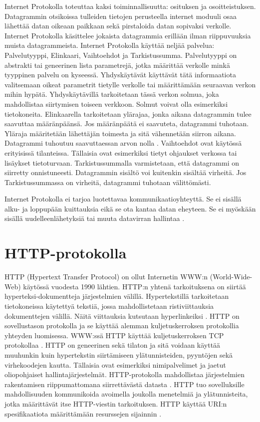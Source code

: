 \documentclass[utf8]{gradu3}
\begin{document}
Internet Protokolla toteuttaa kaksi toiminnallisuutta: osituksen ja osoitteistuksen. Datagrammin otsikoissa tulleiden tietojen perusteella internet moduuli osaa lähettää datan oikeaan paikkaan sekä pirstaloida datan sopivaksi verkolle. Internet Protokolla käsittelee jokaista datagrammia erillään ilman riippuvuuksia muista datagrammeista. Internet Protokolla käyttää neljää palvelua: Palvelutyyppi, Elinkaari, Vaihtoehdot ja Tarkistussumma. Palvelutyyppi on abstrakti tai geneerinen lista parametrejä, jotka määrittää verkolle minkä tyyppinen palvelu on kyseessä. Yhdyskäytävät käyttävät tätä informaatiota valitsemaan oikeat parametrit tietylle verkolle tai määrittämään seuraavan verkon mihin hypätä. Yhdyskäytävillä tarkoitetaan tässä verkon solmua, joka mahdollistaa siirtymisen toiseen verkkoon. Solmut voivat olla esimerkiksi tietokoneita. Elinkaarella tarkoitetaan ylärajaa, jonka aikana datagrammin tulee saavuttaa määränpäänsä. Jos määränpäätä ei saavuteta, datagrammi tuhotaan. Yläraja määritetään lähettäjän toimesta ja sitä vähennetään siirron aikana. Datagrammi tuhoutuu saavuttaessan arvon nolla \parencite{internet_protocol}. Vaihtoehdot ovat käytössä erityisissä tilanteissa. Tällaisia ovat esimerkiksi tietyt ohjaukset verkossa tai lisäykset tietoturvaan. Tarkistussummalla varmistetaan, että datagrammi on siirretty onnistuneesti. Datagrammin sisältö voi kuitenkin sisältää virheitä. Jos Tarkistussummassa on virheitä, datagrammi tuhotaan välittömästi. 

Internet Protokolla ei tarjoa luotettavaa kommunikaatioyhteyttä. Se ei sisällä alku- ja loppupään kuittauksia eikä se ota kantaa datan eheyteen. Se ei myöskään sisällä uudelleenlähetyksiä tai muuta datavirran hallintaa \parencite{internet_protocol}.

\section{HTTP-protokolla}
HTTP (Hypertext Transfer Protocol) on ollut Internetin WWW:n (World-Wide-Web) käytössä vuodesta 1990 lähtien. HTTP:n yhtenä tarkoituksena on siirtää hyperteksi-dokumentteja järjestelmien välillä. Hypertekstillä tarkoitetaan tietokoneissa käytettyä tekstiä, jossa mahdollistetaan ristiviittauksia dokumenttejen välillä. Näitä viittauksia kutsutaan hyperlinkeiksi \parencite{hypertext}. HTTP on sovellustason protokolla ja se käyttää alemman kuljetuskerroksen protokollia yhteyden luomisessa. WWW:ssä HTTP käyttää kuljetuskerroksen TCP protokollaa \parencite{w3http}. HTTP on geneerinen sekä tilaton ja sitä voidaan käyttää muuhunkin kuin hypertekstin siirtämiseen ylätunnisteiden, pyyntöjen sekä virhekoodejen kautta. Tällaisia ovat esimerkiksi nimipalvelimet ja jaetut oliopohjaiset hallintajärjestelmät. HTTP-protokolla mahdollistaa järjestelmien rakentamisen riippumattomana siirrettävästä datasta \parencite{http}. HTTP tuo sovelluksille mahdollisuuden kommunikoida avoimella joukolla menetelmiä ja ylätunnisteita, jotka määrittävät itse HTTP-viestin tarkoituksen. HTTP käyttää URI:n spesifikaatiota määrittämään resurssejen sijainnin \parencite{uri}.
\end{document}
